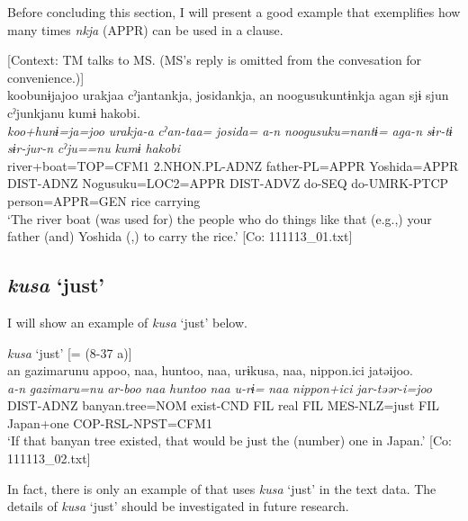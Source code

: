   Before concluding this section, I will present a good example that exemplifies how many times \textit{nkja} (APPR) can be used in a clause.

\ea\label{ex:10.27}   [Context: TM talks to MS. (MS’s reply is omitted from the convesation for convenience.)]\\
      \glll    koobunɨjajoo  urakjaa  cˀjantankja,  josidankja,  an  noogusukuntɨnkja  agan  sjɨ  sjun  cˀjunkjanu  kumɨ  {\textbar}hakobi{\textbar}.\\
    \textit{koo+hunɨ=ja=joo}  \textit{urakja-a}  \textit{cˀan-taa=}  \textit{josida=}  \textit{a-n}  \textit{noogusuku=nantɨ=}  \textit{aga-n}  \textit{sɨr-tɨ}  \textit{sɨr-jur-n}  \textit{cˀju==nu}  \textit{kumɨ}  \textit{hakobi}\\
    river+boat=TOP=CFM1  2.NHON.PL-ADNZ  father-PL=APPR  Yoshida=APPR  DIST-ADNZ  Nogusuku=LOC2=APPR  DIST-ADVZ  do-SEQ  do-UMRK-PTCP  person=APPR=GEN  rice  carrying\\
\glt     ‘The river boat (was used for) the people who do things like that (e.g.,) your father (and) Yoshida (,) to carry the rice.’  [Co: 111113\_01.txt]
\z

\subsection{\textit{kusa} ‘just’}\label{sec:10.1.7}

I will show an example of \textit{kusa} ‘just’ below.

\ea\label{ex:10.28}   \textit{kusa} ‘just’ [= (8-37 a)]\\
      \glll    an  gazimarunu  appoo,  naa,  huntoo,  naa,   urɨkusa,  naa,  {\textbar}nippon.ici{\textbar}  jatəijoo.\\
    \textit{a-n}  \textit{gazimaru=nu}  \textit{ar-boo}  \textit{naa}  \textit{huntoo}  \textit{naa} \textit{u-rɨ=}  \textit{naa}  \textit{nippon+ici}  \textit{jar-təər-i=joo}\\
    DIST-ADNZ  banyan.tree=NOM  exist-CND  FIL  real  FIL MES-NLZ=just  FIL  Japan+one  COP-RSL-NPST=CFM1\\
\glt     ‘If that banyan tree existed, that would be just the (number) one in Japan.’  [Co: 111113\_02.txt]
\z

In fact, there is only an example of  that uses \textit{kusa} ‘just’ in the text data. The details of \textit{kusa} ‘just’ should be investigated in future research.

